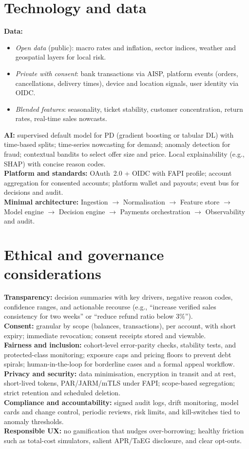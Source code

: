\documentclass[11pt,a4paper]{article}
\begin{document}
\section*{Technology and data}
\textbf{Data:}
\begin{itemize}
  \item \textit{Open data} (public): macro rates and inflation, sector indices, weather and geospatial layers for local risk.
  \item \textit{Private with consent}: bank transactions via AISP, platform events (orders, cancellations, delivery times), device and location signals, user identity via OIDC.
  \item \textit{Blended features}: seasonality, ticket stability, customer concentration, return rates, real-time sales nowcasts.
\end{itemize}
\textbf{AI:} supervised default model for PD (gradient boosting or tabular DL) with time-based splits; time-series nowcasting for demand; anomaly detection for fraud; contextual bandits to select offer size and price. Local explainability (e.g., SHAP) with concise reason codes.\\
\textbf{Platform and standards:} OAuth~2.0 + OIDC with FAPI profile; account aggregation for consented accounts; platform wallet and payouts; event bus for decisions and audit.\\
\textbf{Minimal architecture:} Ingestion $\rightarrow$ Normalisation $\rightarrow$ Feature store $\rightarrow$ Model engine $\rightarrow$ Decision engine $\rightarrow$ Payments orchestration $\rightarrow$ Observability and audit.

\section*{Ethical and governance considerations}
\textbf{Transparency:} decision summaries with key drivers, negative reason codes, confidence ranges, and actionable recourse (e.g., ``increase verified sales consistency for two weeks'' or ``reduce refund ratio below 3\%'').\\
\textbf{Consent:} granular by scope (balances, transactions), per account, with short expiry; immediate revocation; consent receipts stored and viewable.\\
\textbf{Fairness and inclusion:} cohort-level error-parity checks, stability tests, and protected-class monitoring; exposure caps and pricing floors to prevent debt spirals; human-in-the-loop for borderline cases and a formal appeal workflow.\\
\textbf{Privacy and security:} data minimisation, encryption in transit and at rest, short-lived tokens, PAR/JARM/mTLS under FAPI; scope-based segregation; strict retention and scheduled deletion.\\
\textbf{Compliance and accountability:} signed audit logs, drift monitoring, model cards and change control, periodic reviews, risk limits, and kill-switches tied to anomaly thresholds.\\
\textbf{Responsible UX:} no gamification that nudges over-borrowing; healthy friction such as total-cost simulators, salient APR/TaEG disclosure, and clear opt-outs.
\end{document}
